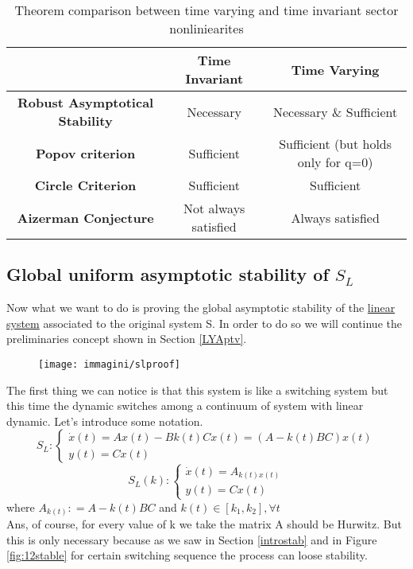 \begin{table}[H]
	\centering
\begin{tabular}{|c|c|c|}
	\hline
	& \textbf{Time Invariant} & \textbf{Time Varying} \\
	\hline
	\textbf{Robust Asymptotical Stability} & Necessary & Necessary \& Sufficient \\
	\hline
	\textbf{Popov criterion} & Sufficient & Sufficient (but holds only for q=0) \\
	\hline
	\textbf{Circle Criterion} & Sufficient & Sufficient \\
	\hline
	\textbf{Aizerman Conjecture} & Not always satisfied & Always satisfied \\
	\hline
\end{tabular}
	\caption{Theorem comparison between time varying and time invariant sector nonliniearites}
\end{table}

\subsection{Global uniform asymptotic stability of $S_L$}
Now what we want to do is proving the global asymptotic stability of the \underline{linear system} associated to the original system S. In order to do so we will continue the preliminaries concept shown in Section \ref{LYAptv}.
\begin{figure}[H]
	\centering
	\texttt{[image: immagini/slproof]}
	\label{fig:slproof}
\end{figure}
The first thing we can notice is that this system is like a switching system but this time the dynamic switches among a continuum of  system with linear dynamic. Let's introduce some notation.
\[S_L\colon \begin{cases}
	\dot{x}(t)=Ax(t)-Bk(t)Cx(t)=(A-k(t)BC)x(t)\\
	y(t)=Cx(t)
\end{cases}
\]
\[S_L(k)\colon \begin{cases}
	\dot{x}(t)=A_{k(t)x(t)}\\
	y(t)=Cx(t)
\end{cases}
\]
where $A_{k(t)}\colon=A-k(t)BC$ and $k(t) \in [k_1,k_2],\forall t$ \\
Ans, of course, for every value of k we take the matrix A should be Hurwitz. But this is only necessary because as we saw in Section \ref{introstab} and in Figure \ref{fig:12stable} for certain switching sequence the process can loose stability.
